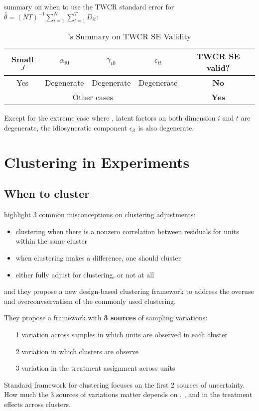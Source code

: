 \documentclass[twoside]{article}
\begin{document}
summary on when to use the TWCR standard error for $\hat{\theta}=\left(NT\right)^{-1}\sum^N_{i=1}\sum^T_{t=1}D_{it}$:
\begin{table}[h!]
    \caption{\citet{chiang2023using}'s Summary on TWCR SE Validity}
    \begin{center}
        \begin{tabular}{ccccc}
        Small $J$ & $\alpha_{i0}$ & $\gamma_{t0}$ & $\epsilon_{it}$ & TWCR SE valid? \\ \hline
        Yes  & Degenerate & Degenerate & Degenerate & \textbf{No} \\
        \multicolumn{4}{c}{Other cases} & \textbf{Yes}
        \end{tabular}
    \end{center}
\end{table}
Except for the extreme case where , latent factors on both dimension $i$ and $t$ are degenerate, the idiosyncratic component $\epsilon_{it}$ is also degenerate.

\section{Clustering in Experiments}
\subsection{When to cluster}
\citet{abadie2023should} highlight 3 common misconceptions on clustering adjustments:
\begin{itemize}
    \item clustering when there is a nonzero correlation between residuals for units within the same cluster
    \item when clustering makes a difference, one should cluster
    \item either fully adjust for clustering, or not at all
\end{itemize}
and they propose a new design-based clustering framework to address the overuse and overconvservatism of the commonly used clustering.

They propose a framework with \textbf{3 sources} of sampling variations:
\begin{itemize}
    \item[1] variation across samples in which units are observed in each cluster 
    \item[2] variation in which clusters are observe
    \item[3] variation in the treatment assignment across units
\end{itemize}
Standard framework for clustering focuses on the first 2 sources of uncertainty. How much the 3 sources of variations matter depends on , , and   in the treatment effects across clusters.
\end{document}
